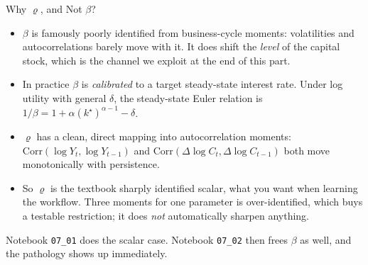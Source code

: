 \documentclass[aspectratio=169,11pt]{beamer}
\newcommand{\emphc}[1]{\textcolor{harvardcrimson}{#1}}
\begin{document}
\begin{frame}{Why $\varrho$, and Not $\beta$?}
\small
\begin{itemize}\itemsep3pt
  \item $\beta$ is famously \emphc{poorly identified from business-cycle moments}: volatilities and autocorrelations barely move with it. It does shift the \emph{level} of the capital stock, which is the channel we exploit at the end of this part.
  \item In practice $\beta$ is \emph{calibrated} to a target steady-state interest rate. Under log utility with general $\delta$, the steady-state Euler relation is $1/\beta = 1 + \alpha (k^\star)^{\alpha-1} - \delta$.
  \item $\varrho$ has a \emphc{clean, direct mapping} into autocorrelation moments: $\mathrm{Corr}(\log Y_t, \log Y_{t-1})$ and $\mathrm{Corr}(\Delta \log C_t, \Delta \log C_{t-1})$ both move monotonically with persistence.
  \item So $\varrho$ is the textbook \emphc{sharply identified} scalar, what you want when learning the workflow. Three moments for one parameter is over-identified, which buys a testable restriction; it does \emph{not} automatically sharpen anything.
\end{itemize}

\vspace{0.2cm}
Notebook \texttt{07\_01} does the scalar case. Notebook \texttt{07\_02} then frees $\beta$ as well, and the pathology shows up immediately.
\end{frame}
\end{document}
